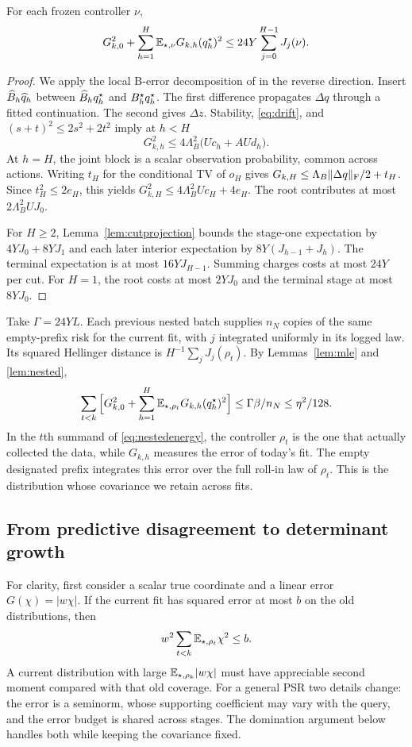 \begin{lemma}\label{lem:nested}
For each frozen controller $\nu$,
\[
 G_{k,0}^2+\sum_{h=1}^H\mathbb E_{\star,\nu}G_{k,h}(q_h^\star)^2
 \le 24Y\sum_{j=0}^{H-1}J_j(\nu).
\]
\end{lemma}
\begin{proof}
We apply the local B-error decomposition of \citet[Propositions F.1--F.2]{bstable} in the reverse direction. Insert $\widehat B_h\widehat q_h$ between $\widehat B_h q_h^\star$ and $B_h^\star q_h^\star$. The first difference propagates $\Delta q$ through a fitted continuation. The second gives $\Delta z$. Stability, \eqref{eq:drift}, and $(s+t)^2\le2s^2+2t^2$ imply at $h<H$
\[
 G_{k,h}^2\le4\Lambda_B^2\big(Uc_h+AUd_h\big).
\]
At $h=H$, the joint block is a scalar observation probability, common across actions. Writing $t_H$ for the conditional TV of $o_H$ gives $G_{k,H}\le\Lambda_B\lVert \Delta q\rVert_{\mathrm F}/2+t_H$. Since $t_H^2\le2e_H$, this yields $G_{k,H}^2\le4\Lambda_B^2 U c_H+4e_H$. The root contributes at most $2\Lambda_B^2 U J_0$.

For $H\ge2$, Lemma~\ref{lem:cutprojection} bounds the stage-one expectation by $4YJ_0+8YJ_1$ and each later interior expectation by $8Y(J_{h-1}+J_h)$. The terminal expectation is at most $16YJ_{H-1}$. Summing charges costs at most $24Y$ per cut. For $H=1$, the root costs at most $2YJ_0$ and the terminal stage at most $8YJ_0$.
\end{proof}

Take $\Gamma=24YL$. Each previous nested batch supplies $n_N$ copies of the same empty-prefix risk for the current fit, with $j$ integrated uniformly in its logged law. Its squared Hellinger distance is $H^{-1}\sum_j J_j(\rho_t)$. By Lemmas~\ref{lem:mle} and \ref{lem:nested},
\begin{equation}
 \sum_{t<k}\Big[G_{k,0}^2+
  \sum_{h=1}^H\mathbb E_{\star,\rho_t}G_{k,h}(q_h^\star)^2\Big]
 \le\Gamma\beta/n_N\le\eta^2/128 .
 \label{eq:nestedenergy}
\end{equation}
In the $t$th summand of \eqref{eq:nestedenergy}, the controller $\rho_t$ is the one that actually collected the data, while $G_{k,h}$ measures the error of today's fit. The empty designated prefix integrates this error over the full roll-in law of $\rho_t$. This is the distribution whose covariance we retain across fits.

\subsection{From predictive disagreement to determinant growth}
For clarity, first consider a scalar true coordinate and a linear error $G(\chi)=|w\chi|$. If the current fit has squared error at most $b$ on the old distributions, then
\[
 w^2\sum_{t<k}\mathbb E_{\star,\rho_t}\chi^2\le b .
\]
A current distribution with large $\mathbb E_{\star,\rho_k}|w\chi|$ must have appreciable second moment compared with that old coverage. For a general PSR two details change: the error is a seminorm, whose supporting coefficient may vary with the query, and the error budget is shared across stages. The domination argument below handles both while keeping the covariance fixed.

